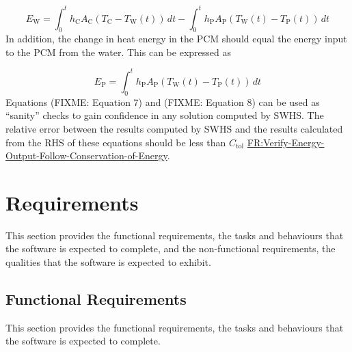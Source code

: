 \documentclass[12pt]{article}
\begin{document}
\begin{displaymath}
{E_{\text{W}}}=\int_{0}^{t}{{h_{\text{C}}} {A_{\text{C}}} \left({T_{\text{C}}}-{T_{\text{W}}}\left(t\right)\right)}\,dt-\int_{0}^{t}{{h_{\text{P}}} {A_{\text{P}}} \left({T_{\text{W}}}\left(t\right)-{T_{\text{P}}}\left(t\right)\right)}\,dt
\end{displaymath}
In addition, the change in heat energy in the PCM should equal the energy input to the PCM from the water. This can be expressed as

\begin{displaymath}
{E_{\text{P}}}=\int_{0}^{t}{{h_{\text{P}}} {A_{\text{P}}} \left({T_{\text{W}}}\left(t\right)-{T_{\text{P}}}\left(t\right)\right)}\,dt
\end{displaymath}
Equations (FIXME: Equation 7) and (FIXME: Equation 8) can be used as ``sanity'' checks to gain confidence in any solution computed by SWHS. The relative error between the results computed by SWHS and the results calculated from the RHS of these equations should be less than ${C_{\text{tol}}}$ \hyperref[verifyEnergyOutput]{FR:Verify-Energy-Output-Follow-Conservation-of-Energy}.

\section{Requirements}
\label{Sec:Requirements}
This section provides the functional requirements, the tasks and behaviours that the software is expected to complete, and the non-functional requirements, the qualities that the software is expected to exhibit.

\subsection{Functional Requirements}
\label{Sec:FRs}
This section provides the functional requirements, the tasks and behaviours that the software is expected to complete.
\end{document}
